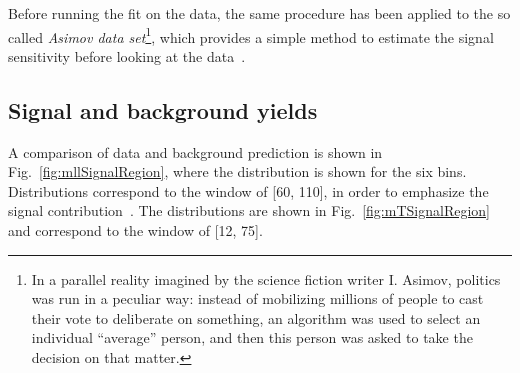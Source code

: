 Before running the fit on the data, the same procedure has been applied to the so called \textit{Asimov data set}\footnote{In a parallel reality imagined by the science fiction writer I. Asimov, politics was run in a peculiar way: instead of mobilizing millions of people to cast their vote to deliberate on something, an algorithm was used to select an individual ``average'' person, and then this person was asked to take the decision on that matter.}, which provides a simple method to estimate the signal sensitivity before looking at the data~\cite{Cowan:2010js}.


\subsection{Signal and background yields}\label{subsec:yields}


A comparison of data and background prediction is shown in Fig.~\ref{fig:mllSignalRegion}, where the \mll{} distribution is shown for the six \pth bins. Distributions correspond to the \mt{} window of [60, 110]\GeV, in order to emphasize the signal contribution~\cite{Chatrchyan:2013iaa}. The \mt distributions are shown in Fig.~\ref{fig:mTSignalRegion} and correspond to the \mll window of [12, 75]\GeV.

